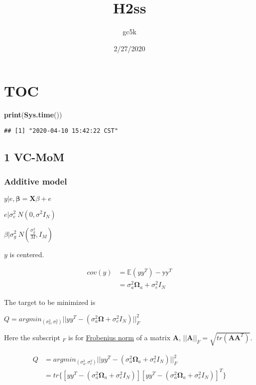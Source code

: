\documentclass[]{article}
\title{H2ss}
\author{gc5k}
\date{2/27/2020}
\newenvironment{Shaded}{\begin{snugshade}}{\end{snugshade}}
\newcommand{\KeywordTok}[1]{\textcolor[rgb]{0.13,0.29,0.53}{\textbf{#1}}}
\newcommand{\NormalTok}[1]{#1}
\begin{document}
\maketitle

{
\setcounter{tocdepth}{2}
\tableofcontents
}
\hypertarget{toc}{%
\section{TOC}\label{toc}}

\begin{Shaded}
\begin{Highlighting}[]
\KeywordTok{print}\NormalTok{(}\KeywordTok{Sys.time}\NormalTok{())}
\end{Highlighting}
\end{Shaded}

\begin{verbatim}
## [1] "2020-04-10 15:42:22 CST"
\end{verbatim}

\hypertarget{vc-mom}{%
\subsection{1 VC-MoM}\label{vc-mom}}

\hypertarget{additive-model}{%
\subsubsection{Additive model}\label{additive-model}}

\(y|e,\mathbf{\beta}=\mathbf{X}\beta+e\)

\(e|\sigma^2_e~N(0,\sigma^2I_N)\)

\(\beta|\sigma^2_g~N(\frac{\sigma^2_g}{M},I_M)\)

\(y\) is centered.

\[
\begin{align}
cov(y)&=\mathbb{E}(yy^T)-\mathbb{y}\mathbb{y}^T\\
&=\sigma^2_a\mathbf{\Omega}_a+\sigma^2_eI_N
\end{align}
\]

The target to be minimized is

\(Q=argmin_{(\sigma^2_a,\sigma^2_e)}|| yy^T-(\sigma^2_a\mathbf{\Omega}+\sigma^2_eI_N)||_F^2\)

Here the subscript \(_{F}\) is for
\href{https://en.wikipedia.org/wiki/Matrix_norm}{Frobenius norm} of a
matrix \(\mathbf{A}\), \(||\mathbf{A}||_F=\sqrt{tr(\mathbf{AA}^T)}\).

\[
\begin{align}
Q&=argmin_{(\sigma^2_a,\sigma^2_e)}|| yy^T-(\sigma^2_a\mathbf{\Omega}_a+\sigma^2_eI_N)||_F^2\\
&=tr\{[yy^T-(\sigma^2_a\mathbf{\Omega}_a+\sigma^2_eI_N)][yy^T-(\sigma^2_a\mathbf{\Omega}_a+\sigma^2_eI_N)]^T\}
\end{align}
\]
\end{document}
